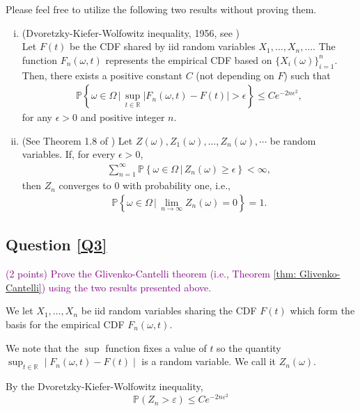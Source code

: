 \documentclass[11pt,letterpaper, leqno]{article}
\numberwithin{equation}{section}
\numberwithin{theorem}{section}
\numberwithin{lemma}{section}
\numberwithin{corollary}{section}
\numberwithin{definition}{section}
\numberwithin{proposition}{section}
\numberwithin{remark}{section}
\numberwithin{example}{section}
\renewcommand{\P}{\mathbb{P}}
\newcommand{\R}{\mathbb{R}}
\begin{document}
Please feel free to utilize the following two results without proving them.
\begin{enumerate}[(i)]
    \item (Dvoretzky-Kiefer-Wolfowitz inequality, 1956, see \cite{dvoretzky1956asymptotic})\\ Let \( F(t) \) be the CDF shared by iid random variables \( X_1, \ldots, X_n, \ldots \). The function \( F_n(\omega,t) \) represents the empirical CDF based on \( \{X_i(\omega)\}_{i=1}^n \). Then, there exists a positive constant $C$ (not depending on $F$) such that 
    \begin{align*}
        \mathbb{P}\left\{\omega\in \Omega\,\Bigg\vert\, \sup_{t\in\mathbb{R}}\vert F_n(\omega,t)-F(t)\vert>\epsilon\right\}\le C e^{-2n\epsilon^2},
    \end{align*}
    for any $\epsilon>0$ and positive integer $n$.
    \item (See Theorem 1.8 of \cite{shao2003mathematical}) Let $Z(\omega), Z_1(\omega), \ldots, Z_n(\omega),\cdots$ be random variables. If, for every $\epsilon>0$,  
    \begin{align*}
        \sum_{n=1}^\infty \mathbb{P}\left\{\omega\in\Omega\,\Big\vert\,  Z_n(\omega) \ge \epsilon \right\}<\infty,
    \end{align*}
    then $Z_n$ converges to $0$ with probability one, i.e.,
    \begin{align*}
        \mathbb{P}\left\{\omega\in\Omega \,\Big\vert\, \lim_{n\rightarrow\infty} Z_n(\omega)=0\right\}=1.
    \end{align*}
\end{enumerate}

\subsection{Question \ref{Q3}}

\textcolor{purple}{(2 points) Prove the Glivenko-Cantelli theorem (i.e., Theorem \ref{thm: Glivenko-Cantelli}) using the two results presented above.}

\color{blue}
    We let $X_1, \ldots, X_n$ be iid random variables sharing the CDF $F(t)$ which form the basis for the empirical CDF $F_n(\omega, t)$. 

    We note that the $\sup$ function fixes a value of $t$ so the quantity $\sup_{t\in \R} \; | \; F_n(\omega, t) - F(t) \; | \;$ is a random variable. We call it $Z_n(\omega)$.

    By the Dvoretzky-Kiefer-Wolfowitz inequality, 
    \[\P(Z_n > \varepsilon) \leq Ce^{-2n\varepsilon^2}\]
\end{document}
